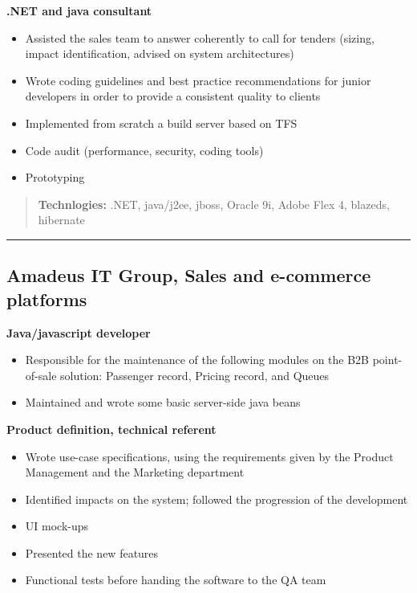 \documentclass[
]{article}
\providecommand{\tightlist}{%
  \setlength{\itemsep}{0pt}\setlength{\parskip}{0pt}}
\begin{document}
\textbf{.NET and java consultant}

\begin{itemize}
\tightlist
\item
  Assisted the sales team to answer coherently to call for tenders
  (sizing, impact identification, advised on system architectures)
\item
  Wrote coding guidelines and best practice recommendations for junior
  developers in order to provide a consistent quality to clients
\item
  Implemented from scratch a build server based on TFS
\item
  Code audit (performance, security, coding tools)
\item
  Prototyping
\end{itemize}

\begin{quote}
\textbf{Technlogies:} .NET, java/j2ee, jboss, Oracle 9i, Adobe Flex 4,
blazeds, hibernate
\end{quote}

\begin{center}\rule{0.5\linewidth}{\linethickness}\end{center}

\hypertarget{amadeus-it-group-sales-and-e-commerce-platforms-092005---022010-4.5yr}{%
\subsection{\texorpdfstring{Amadeus IT Group, Sales and e-commerce
platforms \hfill{}}{Amadeus IT Group, Sales and e-commerce platforms 09/2005 - 02/2010 (\textasciitilde4.5yr+)}}\label{amadeus-it-group-sales-and-e-commerce-platforms-092005---022010-4.5yr}}

\textbf{Java/javascript developer}

\begin{itemize}
\tightlist
\item
  Responsible for the maintenance of the following modules on the B2B
  point-of-sale solution: Passenger record, Pricing record, and Queues
\item
  Maintained and wrote some basic server-side java beans
\end{itemize}

\textbf{Product definition, technical referent}

\begin{itemize}
\tightlist
\item
  Wrote use-case specifications, using the requirements given by the
  Product Management and the Marketing department
\item
  Identified impacts on the system; followed the progression of the
  development
\item
  UI mock-ups
\item
  Presented the new features
\item
  Functional tests before handing the software to the QA team
\end{itemize}
\end{document}
